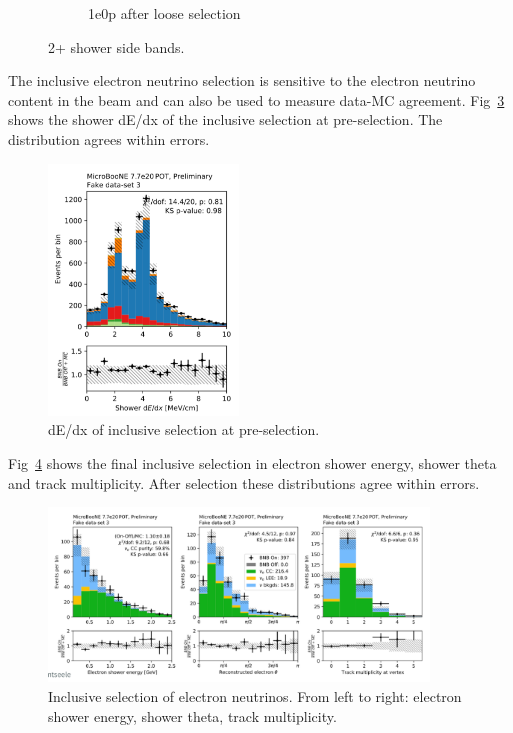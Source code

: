 \begin{figure}[H]
\begin{center}
\begin{subfigure}[b]{0.45\textwidth}
    \caption{\label{fig:fakedata:set3:2shr0p} 1e0p after loose selection}
    \end{subfigure}
\caption{\label{fig:fakedata:set3:2shr} 2+ shower side bands.}
\end{center}
\end{figure}

The inclusive electron neutrino selection is sensitive to the electron neutrino content in the beam and can also be used to measure data-MC agreement.  Fig~\ref{fig:fakedata:set3:inc_presel} shows the shower dE/dx of the inclusive selection at pre-selection.  The distribution agrees within errors.   

\begin{figure}[H]
\begin{center}
\includegraphics[width=0.45\textwidth]{Fakedata/set3/inc_presel.pdf}
\caption{\label{fig:fakedata:set3:inc_presel} dE/dx of inclusive selection at pre-selection.}
\end{center}
\end{figure}

Fig~\ref{fig:fakedata:set3:inc_postsel} shows the final inclusive selection in electron shower energy, shower theta and track multiplicity.  After selection these distributions agree within errors.

\begin{figure}[H]
\begin{center}
\includegraphics[width=0.9\textwidth]{Fakedata/set3/incl_postsel.pdf}
\caption{\label{fig:fakedata:set3:inc_postsel} Inclusive selection of electron neutrinos. From left to right: electron shower energy, shower theta, track multiplicity.}
\end{center}
\end{figure}

